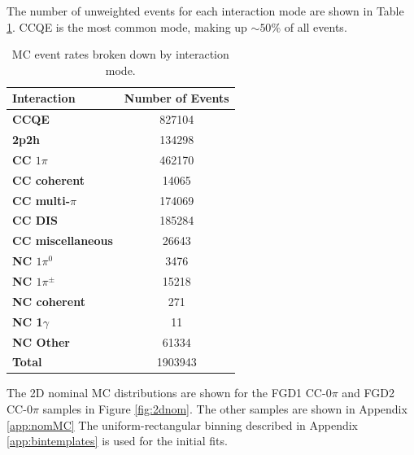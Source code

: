 The number of unweighted events for each interaction mode are shown in Table \ref{tab:modes}. CCQE is the most common mode, making up $\sim50\%$ of all events.

\begin{center}
\begin{table}
\center
\begin{tabular}{l||c}
\hline \hline
\textbf{Interaction} & \textbf{Number of Events}\\
\hline
\hline
\textbf{CCQE} & 827104 \\
\textbf{2p2h} & 134298 \\
\textbf{CC $1\pi$} & 462170 \\
\textbf{CC coherent} & 14065 \\
\textbf{CC multi-$\pi$} & 174069 \\
\textbf{CC DIS} & 185284 \\
\textbf{CC miscellaneous} & 26643 \\
\textbf{NC $1\pi^0$} & 3476 \\
\textbf{NC $1\pi^{\pm}$} & 15218 \\
\textbf{NC coherent} & 271 \\
\textbf{NC 1$\gamma$} & 11 \\
\textbf{NC Other} & 61334 \\ \hline
\textbf{Total} & 1903943\\ \hline\hline
\end{tabular}
\caption{MC event rates broken down by interaction mode.}
\label{tab:modes}
\end{table}
\end{center}

The 2D nominal MC distributions are shown for the FGD1 CC-0$\pi$ and FGD2 CC-0$\pi$ samples in Figure \ref{fig:2dnom}. The other samples are shown in Appendix \ref{app:nomMC} The uniform-rectangular binning described in Appendix \ref{app:bintemplates} is used for the initial fits. 

